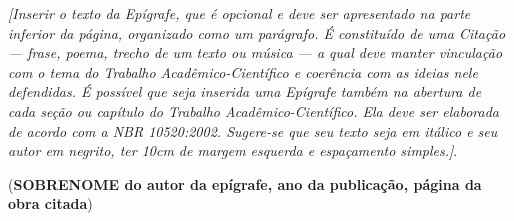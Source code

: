 \vspace*{\fill}

\begin{epigrafe}
    \textit{[Inserir o texto da Epígrafe, que é opcional e deve ser apresentado na parte inferior da página, organizado como um parágrafo. É constituído de uma Citação --- frase, poema, trecho de um texto ou música --- a qual deve manter vinculação com o tema do Trabalho Acadêmico-Científico e coerência com as ideias nele defendidas. É possível que seja inserida uma Epígrafe também na abertura de cada seção ou capítulo do Trabalho Acadêmico-Científico. Ela deve ser elaborada de acordo com a NBR 10520:2002. Sugere-se que seu texto seja em itálico e seu autor em negrito, ter 10cm de margem esquerda e espaçamento simples.]}.
    
    (\textbf{SOBRENOME do autor da epígrafe, ano da publicação, página da obra citada})
\end{epigrafe}

\OnesideTwoside{\clearpage}{\cleardoublepage}